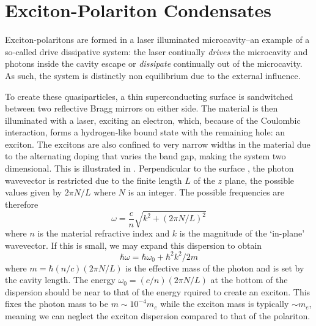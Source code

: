 \section{Exciton-Polariton Condensates}

Exciton-polaritons are formed in a laser illuminated microcavity--an example of a so-called drive dissipative system: the laser contiually \emph{drives} the microcavity and photons inside the cavity escape or 
\emph{dissipate} continually out of the microcavity. As such, the system is distinctly non equilibrium due to the external influence. 

To create these quasiparticles, a thin superconducting surface is sandwitched between two reflective Bragg mirrors on either side. The material is then illuminated with a laser, exciting an electron, which, because of the Coulombic interaction, forms a hydrogen-like bound state with the remaining hole: an exciton. The excitons are also confined to very narrow widths in the material due to the alternating doping that varies the band gap, making the system two dimensional. This is illustrated in \fig{\ref{fig:exciton-polariton}}. Perpendicular to the surface \cite{doi:10.1080/00107514.2010.550120}, the photon wavevector is restricted due to the finite length $L$ of the $z$ plane, the possible values given by $2\pi N/L$ where $N$ is an integer. The possible frequencies are therefore 
\[
\omega = \frac{c}{n}\sqrt{k^2 + (2\pi N/L)^2} 
\]
where $n$ is the material refractive index and $k$ is the magnitude of the `in-plane' wavevector. If this is small, we may expand this dispersion to obtain
\[
\hbar \omega = \hbar \omega_0 + \hbar^2k^2/2m 
\]
where $m = \hbar(n/c)(2 \pi N /L)$ is the effective mass of the photon and is set by the cavity length. The energy  $\omega_0 = (c/n)(2 \pi N / L)$ at the bottom of the dispersion should be near to that of the energy rquired to create an exciton. This fixes the photon mass to be $m \sim 10^{-4}m_e$ while the exciton mass is typically $\sim m_e$, meaning we can neglect the exciton dispersion compared to that of the polariton. 

